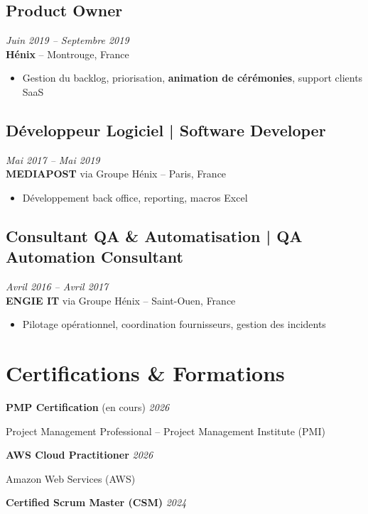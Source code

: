 \documentclass[11pt,a4paper]{article}
\begin{document}
\subsection*{Product Owner} \hfill \textit{Juin 2019 -- Septembre 2019}\\
\textbf{Hénix} -- Montrouge, France\\
\begin{itemize}
    \item Gestion du backlog, priorisation, \textbf{animation de cérémonies}, support clients SaaS
\end{itemize}

\subsection*{Développeur Logiciel | Software Developer} \hfill \textit{Mai 2017 -- Mai 2019}\\
\textbf{MEDIAPOST} via Groupe Hénix -- Paris, France\\
\begin{itemize}
    \item Développement back office, reporting, macros Excel
\end{itemize}

\subsection*{Consultant QA \& Automatisation | QA Automation Consultant} \hfill \textit{Avril 2016 -- Avril 2017}\\
\textbf{ENGIE IT} via Groupe Hénix -- Saint-Ouen, France\\
\begin{itemize}
    \item Pilotage opérationnel, coordination fournisseurs, gestion des incidents
\end{itemize}

\section*{Certifications \& Formations}

\textbf{PMP Certification} (en cours) \hfill \textit{2026}

Project Management Professional -- Project Management Institute (PMI)

\textbf{AWS Cloud Practitioner} \hfill \textit{2026}

Amazon Web Services (AWS)

\textbf{Certified Scrum Master (CSM)} \hfill \textit{2024}
\end{document}
